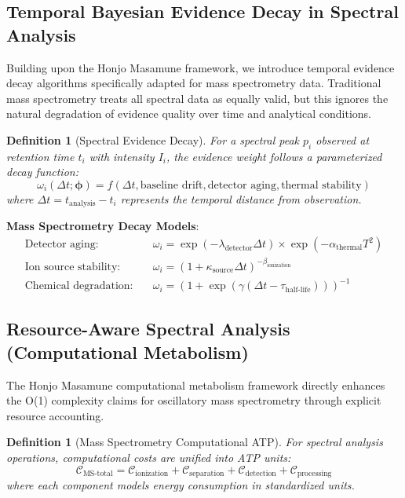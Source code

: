 \documentclass[11pt,a4paper]{article}
\newtheorem{definition}[theorem]{Definition}
\theoremstyle{remark}
\begin{document}
\subsection{Temporal Bayesian Evidence Decay in Spectral Analysis}

Building upon the Honjo Masamune framework, we introduce temporal evidence decay algorithms specifically adapted for mass spectrometry data. Traditional mass spectrometry treats all spectral data as equally valid, but this ignores the natural degradation of evidence quality over time and analytical conditions.

\begin{definition}[Spectral Evidence Decay]
For a spectral peak $p_i$ observed at retention time $t_i$ with intensity $I_i$, the evidence weight follows a parameterized decay function:
\begin{equation}
\omega_i(\Delta t; \boldsymbol{\phi}) = f(\Delta t, \text{baseline drift}, \text{detector aging}, \text{thermal stability})
\end{equation}
where $\Delta t = t_{\text{analysis}} - t_i$ represents the temporal distance from observation.
\end{definition}

\textbf{Mass Spectrometry Decay Models}:
\begin{align}
\text{Detector aging:}\quad & \omega_i = \exp(-\lambda_{\text{detector}} \Delta t) \times \exp(-\alpha_{\text{thermal}} T^2)\\
\text{Ion source stability:}\quad & \omega_i = (1 + \kappa_{\text{source}} \Delta t)^{-\beta_{\text{ionization}}}\\
\text{Chemical degradation:}\quad & \omega_i = \left(1 + \exp(\gamma(\Delta t - \tau_{\text{half-life}}))\right)^{-1}
\end{align}

\subsection{Resource-Aware Spectral Analysis (Computational Metabolism)}

The Honjo Masamune computational metabolism framework directly enhances the O(1) complexity claims for oscillatory mass spectrometry through explicit resource accounting.

\begin{definition}[Mass Spectrometry Computational ATP]
For spectral analysis operations, computational costs are unified into ATP units:
\begin{equation}
\mathcal{C}_{\text{MS-total}} = \mathcal{C}_{\text{ionization}} + \mathcal{C}_{\text{separation}} + \mathcal{C}_{\text{detection}} + \mathcal{C}_{\text{processing}}
\end{equation}
where each component models energy consumption in standardized units.
\end{definition}
\end{document}
